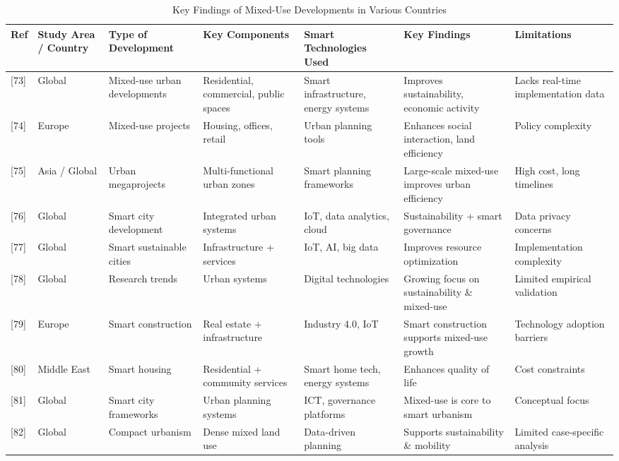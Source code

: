 \documentclass[journal]{IEEEtran}
\begin{document}
\begin{table}[!t]
\caption{Key Findings of Mixed-Use Developments in Various Countries}
\label{tab:mixed}
\centering
\scriptsize
\setlength{\tabcolsep}{3pt}
\renewcommand{\arraystretch}{1.15}
\begin{adjustbox}{width=\textwidth}
\begin{tabular}{@{}l
p{}
p{}
p{}
p{}
p{}
p{}@{}}
\toprule
\textbf{Ref} & \textbf{Study Area / Country} & \textbf{Type of Development} & \textbf{Key Components} & \textbf{Smart Technologies Used} & \textbf{Key Findings} & \textbf{Limitations} \\
\midrule
{[73]} & Global & Mixed-use urban developments & Residential, commercial, public spaces & Smart infrastructure, energy systems & Improves sustainability, economic activity & Lacks real-time implementation data \\
{[74]} & Europe & Mixed-use projects & Housing, offices, retail & Urban planning tools & Enhances social interaction, land efficiency & Policy complexity \\
{[75]} & Asia / Global & Urban megaprojects & Multi-functional urban zones & Smart planning frameworks & Large-scale mixed-use improves urban efficiency & High cost, long timelines \\
{[76]} & Global & Smart city development & Integrated urban systems & IoT, data analytics, cloud & Sustainability + smart governance & Data privacy concerns \\
{[77]} & Global & Smart sustainable cities & Infrastructure + services & IoT, AI, big data & Improves resource optimization & Implementation complexity \\
{[78]} & Global & Research trends & Urban systems & Digital technologies & Growing focus on sustainability \& mixed-use & Limited empirical validation \\
{[79]} & Europe & Smart construction & Real estate + infrastructure & Industry 4.0, IoT & Smart construction supports mixed-use growth & Technology adoption barriers \\
{[80]} & Middle East & Smart housing & Residential + community services & Smart home tech, energy systems & Enhances quality of life & Cost constraints \\
{[81]} & Global & Smart city frameworks & Urban planning systems & ICT, governance platforms & Mixed-use is core to smart urbanism & Conceptual focus \\
{[82]} & Global & Compact urbanism & Dense mixed land use & Data-driven planning & Supports sustainability \& mobility & Limited case-specific analysis \\
\bottomrule
\end{tabular}
\end{adjustbox}
\end{table}
\end{document}
